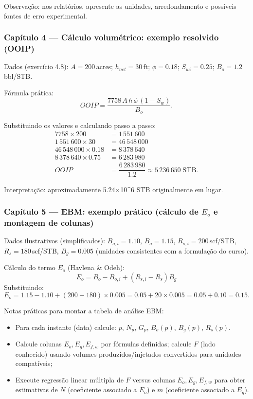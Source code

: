 \documentclass[11pt,a4paper]{article}
\begin{document}
Observação: nos relatórios, apresente as unidades, arredondamento e possíveis fontes de erro experimental.

\subsubsection{Capítulo 4 — Cálculo volumétrico: exemplo resolvido (OOIP)}

Dados (exercício 4.8): $A=200\,$acres; $h_{net}=30\,$ft; $\phi=0.18$; $S_{wi}=0.25$; $B_o=1.2\,$bbl/STB.

Fórmula prática:
$$OOIP=\dfrac{7758\,A\,h\,\phi\,(1-S_w)}{B_o}.$$ 

Substituindo os valores e calculando passo a passo:
\begin{align*}
7758\times200&=1\,551\,600\\
1\,551\,600\times30&=46\,548\,000\\
46\,548\,000\times0.18&=8\,378\,640\\
8\,378\,640\times0.75&=6\,283\,980\\
OOIP&=\dfrac{6\,283\,980}{1.2}\approx5\,236\,650\;\text{STB}.
\end{align*}

Interpretação: aproximadamente 5.24×10^6 STB originalmente em lugar.

\subsubsection{Capítulo 5 — EBM: exemplo prático (cálculo de $E_o$ e montagem de colunas)}

Dados ilustrativos (simplificados): $B_{o,i}=1.10$, $B_o=1.15$, $R_{s,i}=200\,$scf/STB, $R_s=180\,$scf/STB, $B_g=0.005$ (unidades consistentes com a formulação do curso).

Cálculo do termo $E_o$ (Havlena \& Odeh):
$$E_o = B_o - B_{o,i} + (R_{s,i}-R_s)B_g$$
Substituindo:
$$E_o = 1.15 - 1.10 + (200-180)\times0.005 = 0.05 + 20\times0.005 = 0.05 + 0.10 = 0.15.$$ 

Notas práticas para montar a tabela de análise EBM:
\begin{itemize}
\item Para cada instante (data) calcule: $p$, $N_p$, $G_p$, $B_o(p)$, $B_g(p)$, $R_s(p)$.
\item Calcule colunas $E_o,E_g,E_{f,w}$ por fórmulas definidas; calcule $F$ (lado conhecido) usando volumes produzidos/injetados convertidos para unidades compatíveis;
\item Execute regressão linear múltipla de $F$ versus colunas $E_o,E_g,E_{f,w}$ para obter estimativas de $N$ (coeficiente associado a $E_o$) e $m$ (coeficiente associado a $E_g$).
\end{itemize}
\end{document}
